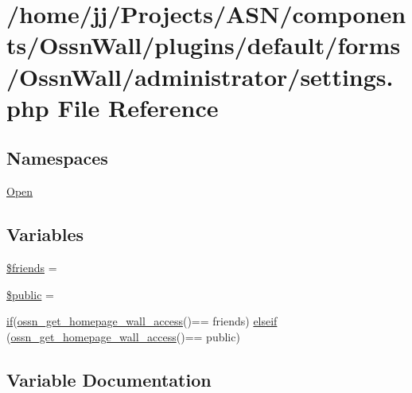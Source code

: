 \hypertarget{components_2_ossn_wall_2plugins_2default_2forms_2_ossn_wall_2administrator_2settings_8php}{}\section{/home/jj/\+Projects/\+A\+S\+N/components/\+Ossn\+Wall/plugins/default/forms/\+Ossn\+Wall/administrator/settings.php File Reference}
\label{components_2_ossn_wall_2plugins_2default_2forms_2_ossn_wall_2administrator_2settings_8php}
\subsection*{Namespaces}
\begin{DoxyCompactItemize}
\item 
 \hyperlink{namespace_open}{Open}
\end{DoxyCompactItemize}
\subsection*{Variables}
\begin{DoxyCompactItemize}
\item 
\hyperlink{components_2_ossn_wall_2plugins_2default_2forms_2_ossn_wall_2administrator_2settings_8php_afb66104a0d5a5b286634a265d216b8d6}{\$friends} = \textquotesingle{}\textquotesingle{}
\item 
\hyperlink{components_2_ossn_wall_2plugins_2default_2forms_2_ossn_wall_2administrator_2settings_8php_a425d32f04d26577103408db8c8612814}{\$public} = \textquotesingle{}\textquotesingle{}
\item 
\hyperlink{jquery_8tokeninput_8js_ad8dd46a3cbc004569e34401e9e71771a}{if}(\hyperlink{_ossn_wall_2ossn__com_8php_ae2b187d64c1ad13774a11c36d0fd9c84}{ossn\+\_\+get\+\_\+homepage\+\_\+wall\+\_\+access}()== \textquotesingle{}friends\textquotesingle{}) \hyperlink{components_2_ossn_wall_2plugins_2default_2forms_2_ossn_wall_2administrator_2settings_8php_a7b2fcc76e395bfb453318ab9dd806bdf}{elseif} (\hyperlink{_ossn_wall_2ossn__com_8php_ae2b187d64c1ad13774a11c36d0fd9c84}{ossn\+\_\+get\+\_\+homepage\+\_\+wall\+\_\+access}()== \textquotesingle{}public\textquotesingle{})
\end{DoxyCompactItemize}


\subsection{Variable Documentation}
